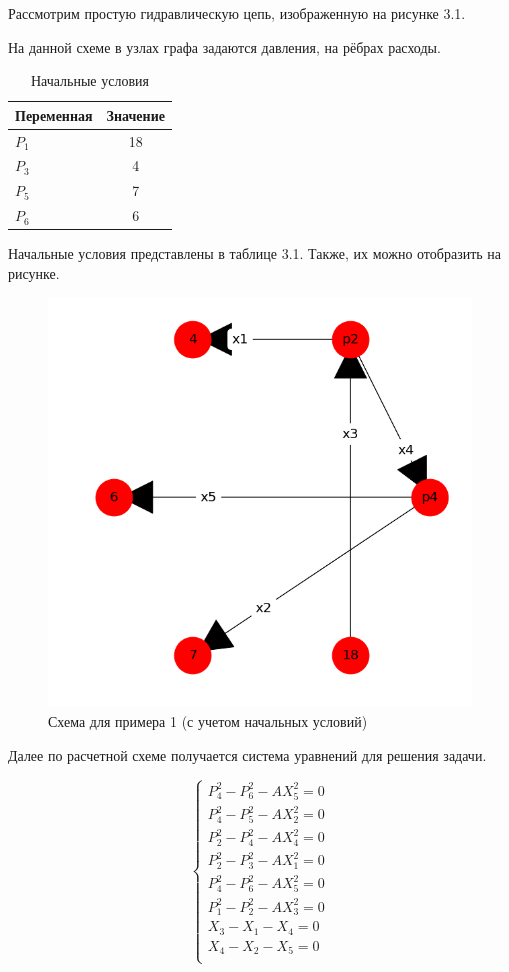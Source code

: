 Рассмотрим простую гидравлическую цепь, изображенную на рисунке 3.1.

На данной схеме в узлах графа задаются давления, на рёбрах расходы.

\begin{table}[h!]
  \centering
    \begin{tabular}{| l | c |}
    \hline
    Переменная & Значение \\ \hline
    $ P_1 $ & 18 \\ \hline
    $ P_3 $ & 4 \\ \hline
    $ P_5 $ & 7 \\ \hline
    $ P_6 $ & 6 \\ \hline

    \end{tabular}
  \caption{Начальные условия}
\end{table}

Начальные условия представлены в таблице 3.1. Также, их можно отобразить на рисунке.

\begin{figure}[h]
  \center\includegraphics[width=0.7\linewidth]{picts/example1/2.png}
  \caption{Схема для примера 1 (с учетом начальных условий)}
  \label{fig:example_1}
\end{figure}

Далее по расчетной схеме получается система уравнений для решения задачи.

\[ 
\begin{cases} 
	P_4^2 - P_6^2 - A X_5^2 = 0 \\
	P_4^2 - P_5^2 - A X_2^2 = 0 \\
	P_2^2 - P_4^2 - A X_4^2 = 0 \\
	P_2^2 - P_3^2 - A X_1^2 = 0 \\
	P_4^2 - P_6^2 - A X_5^2 = 0 \\
	P_1^2 - P_2^2 - A X_3^2 = 0 \\
	X_3 - X_1 - X_4 = 0 \\
	X_4 - X_2 - X_5 = 0 \\
\end{cases}
\]

